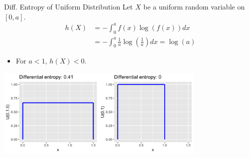 \documentclass[11pt,compress,t,notes=noshow, xcolor=table]{beamer}
\begin{document}
\begin{vbframe}{Diff. Entropy of Uniform Distribution}
Let $X$ be a uniform random variable on $[0, a]$.
  \begin{equation*}
    \begin{aligned} 
      h(X) &= - \int_0^a f(x) \log(f(x)) dx \\
           &= - \int_0^a \frac{1}{a} \log\left(\frac{1}{a}\right) dx = \log(a) 
    \end{aligned}
  \end{equation*}
  \begin{itemize}
    \item For $a < 1$, $h(X) < 0$.
    \end{itemize}
    
    \begin{center}
    \includegraphics[width = 10cm ]{figure/uni_entropy.png}
    \end{center}
    
\end{vbframe}
\end{document}

